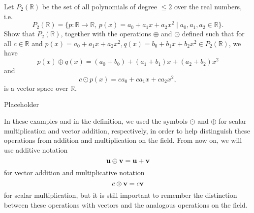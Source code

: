 \begin{exmp}
Let $ P_2(\mathbb{R}) $ be the set of all polynomials of degree $ \leq 2 $ over the real numbers, i.e.
\begin{equation*}
    P_2(\mathbb{R})=\{p:\mathbb{R}\to\mathbb{R},\,p(x)=a_0+a_1x+a_2x^2\mid a_0,a_1,a_2\in\mathbb{R}\}.
\end{equation*}
Show that $ P_2(\mathbb{R}) $, together with the operations $ \oplus $ and $ \odot $ defined such that for all $ c\in\mathbb{R} $ and $ p(x)=a_0+a_1x+a_2x^2,q(x)=b_0+b_1x+b_2x^2\in P_2(\mathbb{R}) $, we have
\begin{equation*}
    p(x)\oplus q(x)=(a_0+b_0)+(a_1+b_1)x+(a_2+b_2)x^2
\end{equation*}
and
\begin{equation*}
    c\odot p(x)=ca_0+ca_1x+ca_2x^2,
\end{equation*}
is a vector space over $ \mathbb{R} $.
\end{exmp}
\begin{sltn}
Placeholder
\end{sltn}

In these examples and in the definition, we used the symbols $ \odot $ and $ \oplus $ for scalar multiplication and vector addition, respectively, in order to help distinguish these operations from addition and multiplication on the field. From now on, we will use additive notation
\begin{equation*}
    \boldsymbol{\mathbf{u}}\oplus\boldsymbol{\mathbf{v}}=\boldsymbol{\mathbf{u}}+\boldsymbol{\mathbf{v}}
\end{equation*}
for vector addition and multiplicative notation
\begin{equation*}
    c\odot\boldsymbol{\mathbf{v}}=c\boldsymbol{\mathbf{v}}
\end{equation*}
for scalar multiplication, but it is still important to remember the distinction between these operations with vectors and the analogous operations on the field.

